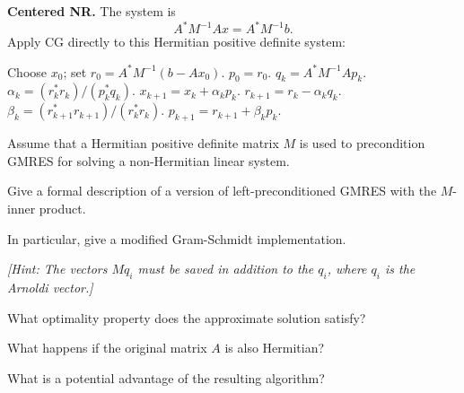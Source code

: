 \documentclass{ctexart}
\begin{document}
\begin{solution}
  \textbf{Centered NR.}
  The system is
  \[
    A^*M^{-1}Ax=A^*M^{-1}b.
  \]
  Apply CG directly to this Hermitian positive definite system:
  \begin{algorithm}[H]
    \caption{Centered NR-CG}
    \begin{algorithmic}[1]
      \State Choose $x_0$; set $r_0=A^*M^{-1}(b-Ax_0)$.
      \State $p_0=r_0$.
      \State $q_k=A^*M^{-1}Ap_k$.
      \State $\alpha_k=(r_k^*r_k)/(p_k^*q_k)$.
      \State $x_{k+1}=x_k+\alpha_kp_k$.
      \State $r_{k+1}=r_k-\alpha_kq_k$.
      \State $\beta_k=(r_{k+1}^*r_{k+1})/(r_k^*r_k)$.
      \State $p_{k+1}=r_{k+1}+\beta_kp_k$.
      \EndFor
    \end{algorithmic}
  \end{algorithm}
\end{solution}
\begin{problem}\label{pro:8}
  Assume that a Hermitian positive definite matrix $M$ is used to precondition GMRES for solving a non-Hermitian linear system.

  Give a formal description of a version of left-preconditioned GMRES with the $M$-inner product.

  In particular, give a modified Gram-Schmidt implementation.

  \textit{[Hint: The vectors $Mq_i$ must be saved in addition to the $q_i$, where $q_i$ is the Arnoldi vector.]}

  What optimality property does the approximate solution satisfy?

  What happens if the original matrix $A$ is also Hermitian?

  What is a potential advantage of the resulting algorithm?
\end{problem}
\end{document}

